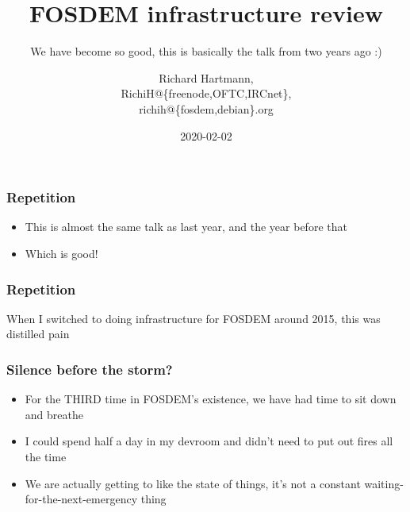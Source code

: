 \documentclass[aspectratio=169]{beamer}
\title{FOSDEM infrastructure review}
\subtitle{We have become so good, this is basically the talk from two years ago :)}
\author{Richard Hartmann,\\
RichiH@\{freenode,OFTC,IRCnet\},\\
richih@\{fosdem,debian\}.org}
\date{2020-02-02}
\begin{document}
\setcounter{tocdepth}{1}

\begin{frame}
	\titlepage
\end{frame}





\begin{frame}
	\frametitle{Repetition}
	\vfill
	\begin{itemize}
		\item This is almost the same talk as last year, and the year before that
		\item Which is good!
	\end{itemize}
	\vfill
\end{frame}

\begin{frame}
	\frametitle{Repetition}
	\begin{center}
		\vfill
		When I switched to doing infrastructure for FOSDEM around 2015, this was distilled pain
		\vfill
	\end{center}
\end{frame}


\begin{frame}
	\frametitle{Silence before the storm?}
	\vfill
	\begin{itemize}
		\item For the THIRD time in FOSDEM's existence, we have had time to sit down and breathe
		\item I could spend half a day in my devroom and didn't need to put out fires all the time
		\item We are actually getting to like the state of things, it's not a constant waiting-for-the-next-emergency thing
	\end{itemize}
	\vfill
\end{frame}
\end{document}
